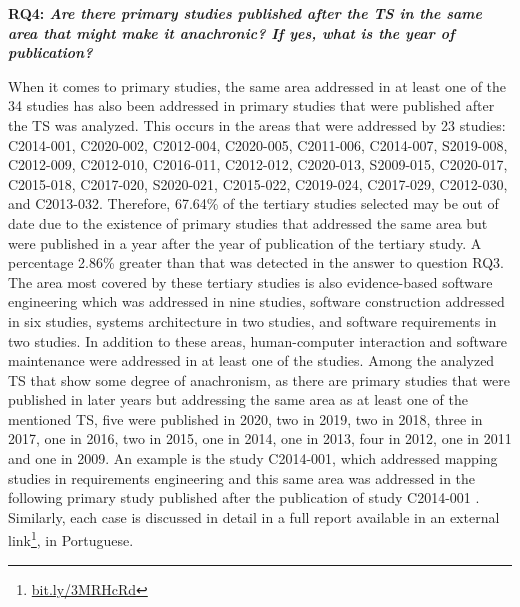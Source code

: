 \documentclass[sigconf]{acmart}
\begin{document}



\textbf{RQ4: \textit{Are there primary studies published after the TS in the same area that might make it anachronic? If yes, what is the year of publication?}}

When it comes to primary studies, the same area addressed in at least one of the 34 studies has also been addressed in primary studies that were published after the TS was analyzed. This occurs in the areas that were addressed by 23 studies: C2014-001, C2020-002, C2012-004, C2020-005, C2011-006, C2014-007, S2019-008, C2012-009, C2012-010, C2016-011, C2012-012, C2020-013, S2009-015, C2020-017, C2015-018, C2017-020, S2020-021, C2015-022, C2019-024, C2017-029, C2012-030, and C2013-032. Therefore, 67.64\% of the tertiary studies selected may be out of date due to the existence of primary studies that addressed the same area but were published in a year after the year of publication of the tertiary study. A percentage 2.86\% greater than that was detected in the answer to question RQ3. The area most covered by these tertiary studies is also evidence-based software engineering which was addressed in nine studies, software construction addressed in six studies, systems architecture in two studies, and software requirements in two studies. In addition to these areas, human-computer interaction and software maintenance were addressed in at least one of the studies. Among the analyzed TS that show some degree of anachronism, as there are primary studies that were published in later years but addressing the same area as at least one of the mentioned TS, five were published in 2020, two in 2019, two in 2018, three in 2017, one in 2016, two in 2015, one in 2014, one in 2013,  four in 2012, one in 2011 and one in 2009. An example is the study C2014-001, which addressed mapping studies in requirements engineering and this same area was addressed in the following primary study published after the publication of study C2014-001 \cite{Holm2015}. Similarly, each case is discussed in detail in a full report available in an external link\footnote{\url{bit.ly/3MRHcRd}}, in Portuguese.
\end{document}
